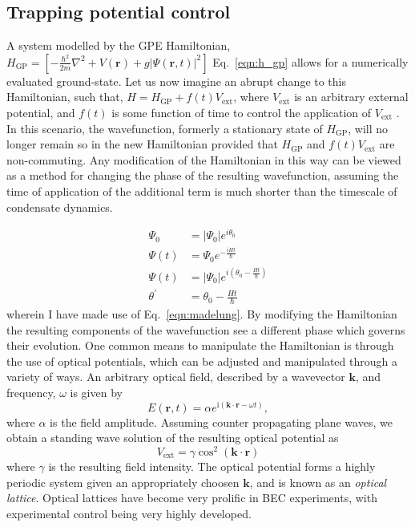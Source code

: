 \subsection{Trapping potential control}
A system modelled by the GPE Hamiltonian, $H_{\textrm{GP}} = \left[-\frac{\hbar^2}{2m}\nabla^2 + V(\textbf{r}) + g\vert\Psi(\textbf{r},t)\vert^2 \right]$ Eq.~\ref{eqn:h_gp} allows for a numerically evaluated ground-state. Let us now imagine an abrupt change to this Hamiltonian, such that, $H = H_{\textrm{GP}} + f(t) V_{\textrm{ext}}$, where  $V_{\textrm{ext}}$ is an arbitrary external potential, and $f(t)$ is some function of time to control the application of $V_{\textrm{ext}}$ . In this scenario, the wavefunction, formerly a stationary state of $H_{\textrm{GP}}$, will no longer remain so in the new Hamiltonian provided that $H_{\textrm{GP}} $ and $f(t) V_{\textrm{ext}}$ are non-commuting. Any modification of the Hamiltonian in this way can be viewed as a method for changing the phase of the resulting wavefunction, assuming the time of application of the additional term is much shorter than the timescale of condensate dynamics.

\begin{subequations}
\begin{align}
    \Psi_0 &= |\Psi_0|e^{i\theta_0} \\
    \Psi(t) &= \Psi_0 e^{-\frac{i H t}{\hbar}} \\
    \Psi(t) &= |\Psi_0| e^{i\left(\theta_0 - \frac{H t}{\hbar}\right)} \\
    \theta^{'} &= \theta_0 - \frac{H t}{\hbar}
\end{align}
\end{subequations}
wherein I have made use of Eq.~\ref{eqn:madelung}. By modifying the Hamiltonian the resulting components of the wavefunction see a different phase which governs their evolution. One common means to manipulate the Hamiltonian is through the use of optical potentials, which can be adjusted and manipulated through a variety of ways. An arbitrary optical field, described by a wavevector $\mathbf{k}$, and frequency, $\omega$ is given by
\begin{equation}
    E(\mathbf{r},t) = \alpha e^{\textrm{i}\left(\mathbf{k}\cdot\mathbf{r} - \omega t\right)},
\end{equation}
where $\alpha$ is the field amplitude. Assuming counter propagating plane waves, we obtain a standing wave solution of the resulting optical potential as
\begin{equation}
    V_{\textrm{ext}} = \gamma \cos^2 (\mathbf{k} \cdot \mathbf{r})
\end{equation}
where $\gamma$ is the resulting field intensity. The optical potential forms a highly periodic system given an appropriately choosen $\mathbf{k}$, and is known as an \textit{optical lattice}. Optical lattices have become very prolific in BEC experiments, with experimental control being very highly developed.

